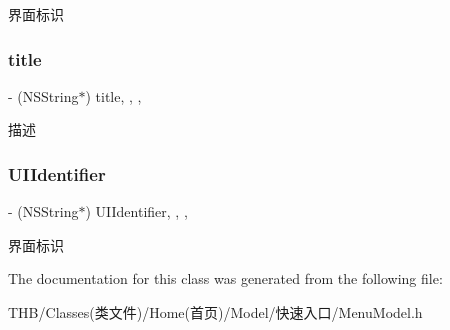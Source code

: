 界面标识 \mbox{\label{interface_menu_model_a6e5005e6fd0c6b6ff5279c0e6bcc01e7}} 
\subsubsection{\texorpdfstring{title}{title}}
{\footnotesize\ttfamily -\/ (N\+S\+String$\ast$) title\hspace{0.3cm}{\ttfamily [read]}, {\ttfamily [write]}, {\ttfamily [nonatomic]}, {\ttfamily [copy]}}

描述 \mbox{\label{interface_menu_model_a6e05e1ef39c0f009d4e35fcd7ec94778}} 
\subsubsection{\texorpdfstring{U\+I\+Identifier}{UIIdentifier}}
{\footnotesize\ttfamily -\/ (N\+S\+String$\ast$) U\+I\+Identifier\hspace{0.3cm}{\ttfamily [read]}, {\ttfamily [write]}, {\ttfamily [nonatomic]}, {\ttfamily [copy]}}

界面标识 

The documentation for this class was generated from the following file\+:\begin{DoxyCompactItemize}
\item 
T\+H\+B/\+Classes(类文件)/\+Home(首页)/\+Model/快速入口/Menu\+Model.\+h\end{DoxyCompactItemize}
